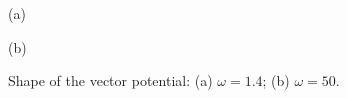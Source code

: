 \begin{figure}[h!]
\begin{minipage}[h]{0.5\linewidth}
 (a) \\
\end{minipage}
\hfill
\begin{minipage}[h]{0.5\linewidth}
 (b) \\
\end{minipage}
\caption{Shape of the vector potential: (a) $\omega=1.4$; (b) $\omega=50$.}
\label{fig:Pulses_ir_xray}
\end{figure}

